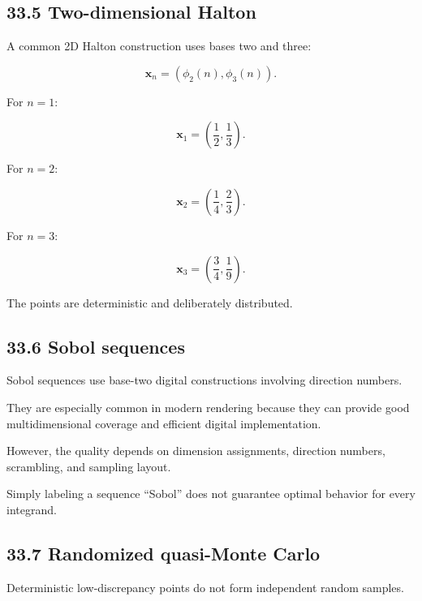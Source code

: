 \subsection{33.5 Two-dimensional Halton}\label{02-foundations-ii-ch031-two-dimensional-halton}

\hypertarget{02-foundations-ii-ch031-two-dimensional-halton}{}

A common 2D Halton construction uses bases two and three:

\[ \boxed{ \mathbf x_n= (\phi_2(n),\phi_3(n)) }. \]

For \(n=1\):

\[ \boxed{ \mathbf x_1= \left(\frac12,\frac13\right) }. \]

For \(n=2\):

\[ \boxed{ \mathbf x_2= \left(\frac14,\frac23\right) }. \]

For \(n=3\):

\[ \boxed{ \mathbf x_3= \left(\frac34,\frac19\right) }. \]

The points are deterministic and deliberately distributed.

\subsection{33.6 Sobol sequences}\label{02-foundations-ii-ch031-sobol-sequences}

\hypertarget{02-foundations-ii-ch031-sobol-sequences}{}

Sobol sequences use base-two digital constructions involving direction numbers.

They are especially common in modern rendering because they can provide good multidimensional coverage and efficient digital implementation.

However, the quality depends on dimension assignments, direction numbers, scrambling, and sampling layout.

Simply labeling a sequence ``Sobol'' does not guarantee optimal behavior for every integrand.

\subsection{33.7 Randomized quasi-Monte Carlo}\label{02-foundations-ii-ch031-randomized-quasi-monte-carlo}

\hypertarget{02-foundations-ii-ch031-randomized-quasi-monte-carlo}{}

Deterministic low-discrepancy points do not form independent random samples.


